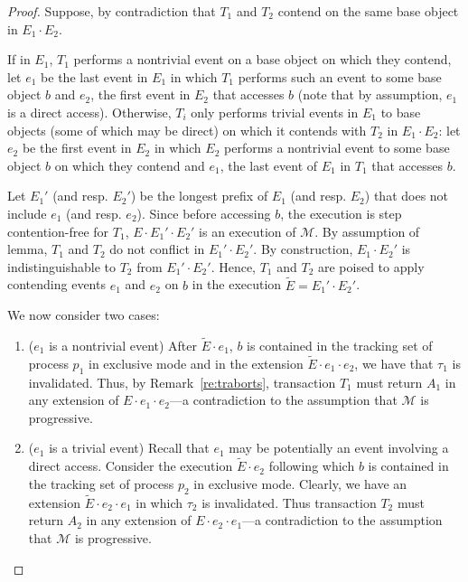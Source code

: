 \begin{proof}
	Suppose, by contradiction that $T_1$ and $T_2$ 
	contend on the same base object in $E_1\cdot E_2$.
	
	If in $E_1$, $T_1$ performs a nontrivial event on a base object on which they contend, let $e_1$ be the last
	event in $E_1$ in which $T_1$ performs such an event to some base object $b$ and $e_2$, the first event
	in $E_2$ that accesses $b$ (note that by assumption, $e_1$ is a direct access).
	Otherwise, $T_i$ only performs trivial events in $E_1$ to base objects (some of which may be direct) on which it contends with $T_{2}$ in $E_1\cdot E_2$:
	let $e_2$ be the first event in $E_2$ in which $E_2$ performs a nontrivial event to some base object $b$
	on which they contend and $e_1$, the last event of $E_1$ in $T_1$ that accesses $b$.
	
	Let $E_1'$ (and resp. $E_2'$) be the longest prefix of $E_1$ (and resp. $E_2$) that does not include
	$e_1$ (and resp. $e_2$).
	Since before accessing $b$, the execution is step contention-free for $T_1$, $E \cdot
	E_1'\cdot E_2'$ is an execution of $\mathcal{M}$.
	By assumption of lemma, $T_1$ and $T_2$ do not conflict in $E_1'\cdot E_2'$.
	By construction, $E_1 \cdot E_2'$ is indistinguishable to $T_2$ from $E_1' \cdot E_2'$.
	Hence, $T_1$ and $T_{2}$ are poised to apply contending events $e_1$ and $e_2$ on $b$ in the execution
	$\tilde E=E_1' \cdot E_2'$.
	
	We now consider two cases:
	\begin{enumerate}
		\item 
		($e_1$ is a nontrivial event)
		After $\tilde E\cdot e_1$, $b$ is contained in the tracking set of process
		$p_1$ in exclusive mode and in the extension $\tilde E\cdot e_1 \cdot e_2$, we have that
		$\tau_1$ is invalidated. Thus, by Remark~\ref{re:traborts}, transaction $T_1$ must return $A_1$ 
		in any extension of $E\cdot e_1\cdot e_2$---a contradiction
		to the assumption that $\mathcal{M}$ is progressive.   
		\item
		($e_1$ is a trivial event)
		Recall that $e_1$ may be potentially an event involving a direct access.
		Consider the execution $\tilde E\cdot e_2$ following which $b$ is contained in the tracking set of process
		$p_{2}$ in exclusive mode. Clearly, we have an extension $\tilde E\cdot e_2 \cdot e_1$ in which
		$\tau_{2}$ is invalidated. Thus transaction $T_{2}$ must return $A_{2}$ in any extension of $E\cdot e_2\cdot e_1$---a contradiction
		to the assumption that $\mathcal{M}$ is progressive.   
	\end{enumerate}
\end{proof}
